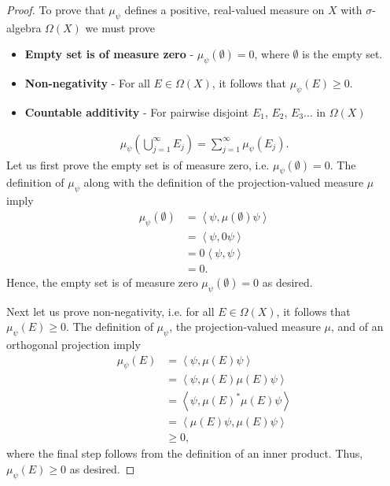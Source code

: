 \begin{proof}
    \leanok
To prove that $\mu_\psi$ defines a positive, real-valued measure on $X$ with $\sigma$-algebra $\Omega(X)$ we must prove
\begin{itemize}
    \item \textbf{Empty set is of measure zero} - $\mu_\psi(\emptyset) = 0$, where $\emptyset$ is the empty set.
    \item \textbf{Non-negativity} - For all $E \in \Omega(X)$, it follows that $\mu_\psi(E) \ge 0$.
    \item \textbf{Countable additivity} - For pairwise disjoint $E_1$, $E_2$, $E_3$... in $\Omega(X)$
\end{itemize}
\begin{align}
    \mu_\psi \left( \bigcup_{j = 1}^{\infty} E_j \right) = \sum_{j = 1}^{\infty} \mu_\psi(E_j).
\end{align}
Let us first prove the empty set is of measure zero, i.e. $\mu_\psi(\emptyset) = 0$. The definition of $\mu_\psi$ along with the definition of the projection-valued measure $\mu$ imply
\begin{align}
    \mu_\psi(\emptyset) &= \left< \psi, \mu(\emptyset) \psi \right> \\
                        &= \left< \psi, 0 \psi \right> \\
                        &= 0 \left< \psi, \psi \right> \\
                        &= 0.
\end{align}
Hence, the empty set is of measure zero $\mu_\psi(\emptyset) = 0$ as desired.

Next let us prove non-negativity, i.e. for all $E \in \Omega(X)$, it follows that $\mu_\psi(E) \ge 0$. The definition of $\mu_\psi$, the projection-valued measure $\mu$, and of an orthogonal projection imply
\begin{align}
    \mu_\psi(E) &= \left< \psi, \mu(E) \psi \right> \\
                &= \left< \psi, \mu(E) \mu(E) \psi \right>  \\
                &= \left< \psi, \mu(E)^* \mu(E) \psi \right>  \\
                &= \left< \mu(E) \psi, \mu(E) \psi \right>  \\
                &\ge 0,
\end{align}
where the final step follows from the definition of an inner product. Thus, $\mu_\psi(E) \ge 0$ as desired.


\end{proof}
